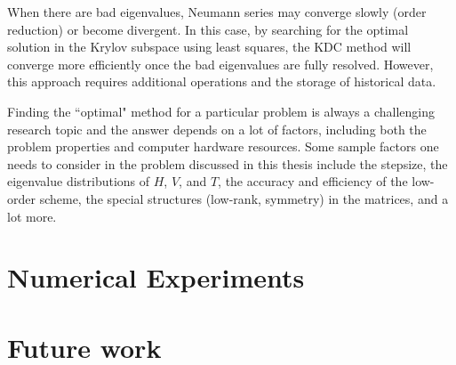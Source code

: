 \documentclass[12pt]{article}
\begin{document}
When there are bad eigenvalues, Neumann series may converge slowly (order reduction) or become divergent.
In this case, by searching for the optimal solution in the Krylov subspace using least squares,
the KDC method will converge more efficiently once the bad eigenvalues are fully resolved. However, this
approach requires additional operations and the storage of historical data. 

Finding the ``optimal" method for a particular problem is always a challenging research topic and the answer 
depends on a lot of factors, including both the problem properties and computer hardware resources.
Some sample factors one needs to consider in the problem discussed in this thesis include the stepsize,
the eigenvalue distributions of $H$, $V$, and $T$, the accuracy and efficiency of the low-order scheme,
the special structures (low-rank, symmetry) in the matrices, and a lot more.

\section{Numerical Experiments}

\section{Future work}


\newpage 

\setcounter{page}{1}

%
\end{document}
